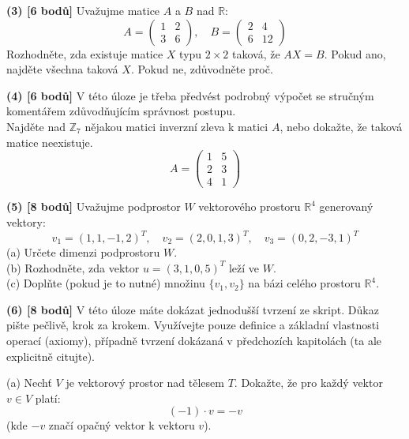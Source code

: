 \documentclass[a4paper,11pt]{article}
\begin{document}
\vspace{6cm}

\noindent
\textbf{(3) [6 bodů]} Uvažujme matice $A$ a $B$ nad $\mathbb{R}$:
$$ A = \left( \begin{matrix} 1 & 2 \\ 3 & 6 \end{matrix} \right), \quad B = \left( \begin{matrix} 2 & 4 \\ 6 & 12 \end{matrix} \right) $$
Rozhodněte, zda existuje matice $X$ typu $2 \times 2$ taková, že $AX = B$. Pokud ano, najděte všechna taková $X$. Pokud ne, zdůvodněte proč.

\newpage

\noindent
\textbf{(4) [6 bodů]} V této úloze je třeba předvést podrobný výpočet se stručným komentářem zdůvodňujícím správnost postupu. \\
Najděte nad $\mathbb{Z}_7$ nějakou matici inverzní zleva k matici $A$, nebo dokažte, že taková matice neexistuje.
$$ A = \left( \begin{matrix} 1 & 5 \\ 2 & 3 \\ 4 & 1 \end{matrix} \right) $$

\vspace{8cm}

\noindent
\textbf{(5) [8 bodů]} Uvažujme podprostor $W$ vektorového prostoru $\mathbb{R}^4$ generovaný vektory:
$$ v_1 = (1, 1, -1, 2)^T, \quad v_2 = (2, 0, 1, 3)^T, \quad v_3 = (0, 2, -3, 1)^T $$
(a) Určete dimenzi podprostoru $W$. \\
(b) Rozhodněte, zda vektor $u = (3, 1, 0, 5)^T$ leží ve $W$. \\
(c) Doplňte (pokud je to nutné) množinu $\{v_1, v_2\}$ na bázi celého prostoru $\mathbb{R}^4$.

\newpage

\noindent
\textbf{(6) [8 bodů]} V této úloze máte dokázat jednodušší tvrzení ze skript. Důkaz pište pečlivě, krok za krokem. Využívejte pouze definice a základní vlastnosti operací (axiomy), případně tvrzení dokázaná v předchozích kapitolách (ta ale explicitně citujte).

\vspace{3mm}

\noindent
(a) Nechť $V$ je vektorový prostor nad tělesem $T$. Dokažte, že pro každý vektor $v \in V$ platí:
$$ (-1) \cdot v = -v $$
(kde $-v$ značí opačný vektor k vektoru $v$).
\end{document}
